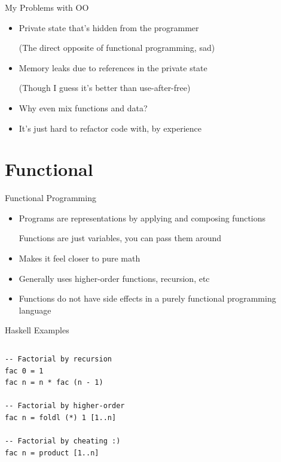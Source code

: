 \documentclass[aspectratio=169]{beamer}
\begin{document}
\begin{frame}{My Problems with OO}
	\begin{itemize}
		\item Private state that's hidden from the programmer
			
			(The direct opposite of functional programming, sad)
		\item Memory leaks due to references in the private state

			(Though I guess it's better than use-after-free)
		\item Why even mix functions and data?
		\item It's just hard to refactor code with, by experience
	\end{itemize}
\end{frame}

\section{Functional}

\begin{frame}{Functional Programming}
	\begin{itemize}
		\item Programs are representations by applying and composing functions

			Functions are just variables, you can pass them around
		\item Makes it feel closer to pure math
		\item Generally uses higher-order functions, recursion, etc
		\item Functions do not have side effects in a purely functional programming language
	\end{itemize}
\end{frame}

\begin{frame}[fragile]{Haskell Examples}
	\begin{columns}
		\begin{verbatim}
-- Factorial by recursion
fac 0 = 1
fac n = n * fac (n - 1)

-- Factorial by higher-order
fac n = foldl (*) 1 [1..n]

-- Factorial by cheating :)
fac n = product [1..n]
		\end{verbatim}
		\begin{verbatim}

		\end{verbatim}
	\end{columns}
\end{frame}
\end{document}
